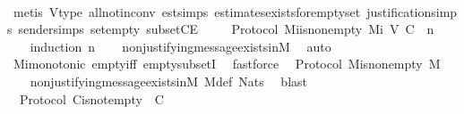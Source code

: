\begin{isabellebody}
\ \ \ \ \isamarkupfalse%
\ {\isacharparenleft}metis\ V{\isacharunderscore}type\ all{\isacharunderscore}not{\isacharunderscore}in{\isacharunderscore}conv\ est{\isachardot}simps\ estimates{\isacharunderscore}exists{\isacharunderscore}for{\isacharunderscore}empty{\isacharunderscore}set\ justification{\isachardot}simps\ sender{\isachardot}simps\ set{\isacharunderscore}empty\ subsetCE{\isacharparenright}\isanewline
{}\isamarkupfalse%
%
\endisatagproof
{\isafoldproof}%
%
\isadelimproof
\ \ \isanewline
%
\endisadelimproof
\isanewline
{}\isamarkupfalse%
\ {\isacharparenleft}\ Protocol{\isacharparenright}\ M{\isacharunderscore}i{\isacharunderscore}is{\isacharunderscore}non{\isacharunderscore}empty{\isacharcolon}\ {\isachardoublequoteopen}M{\isacharunderscore}i\ {\isacharparenleft}V{\isacharcomma}\ C{\isacharcomma}\ {\isasymepsilon}{\isacharparenright}\ n\ {\isasymnoteq}\ {\isasymemptyset}{\isachardoublequoteclose}\isanewline
%
\isadelimproof
\ \ %
\endisadelimproof
%
\isatagproof
{}\isamarkupfalse%
\ {\isacharparenleft}induction\ n{\isacharparenright}\isanewline
\ \ \isamarkupfalse%
\ non{\isacharunderscore}justifying{\isacharunderscore}message{\isacharunderscore}exists{\isacharunderscore}in{\isacharunderscore}M{\isacharunderscore}{}\ \isamarkupfalse%
\ auto\isanewline
\ \ \isamarkupfalse%
\ Mi{\isacharunderscore}monotonic\ empty{\isacharunderscore}iff\ empty{\isacharunderscore}subsetI\ \isamarkupfalse%
\ fastforce%
\endisatagproof
{\isafoldproof}%
%
\isadelimproof
\isanewline
%
\endisadelimproof
\isanewline
{}\isamarkupfalse%
\ {\isacharparenleft}\ Protocol{\isacharparenright}\ M{\isacharunderscore}is{\isacharunderscore}non{\isacharunderscore}empty{\isacharcolon}\ {\isachardoublequoteopen}M\ {\isasymnoteq}\ {\isasymemptyset}{\isachardoublequoteclose}\isanewline
%
\isadelimproof
\ \ %
\endisadelimproof
%
\isatagproof
{}\isamarkupfalse%
\ non{\isacharunderscore}justifying{\isacharunderscore}message{\isacharunderscore}exists{\isacharunderscore}in{\isacharunderscore}M{\isacharunderscore}{}\ M{\isacharunderscore}def\ Nats{\isacharunderscore}{}\ \isamarkupfalse%
\ blast%
\endisatagproof
{\isafoldproof}%
%
\isadelimproof
\isanewline
%
\endisadelimproof
\isanewline
{}\isamarkupfalse%
\ {\isacharparenleft}\ Protocol{\isacharparenright}\ C{\isacharunderscore}is{\isacharunderscore}not{\isacharunderscore}empty\ {\isacharcolon}\ {\isachardoublequoteopen}C\ {\isasymnoteq}\ {\isasymemptyset}{\isachardoublequoteclose}\isanewline

\end{isabellebody}
